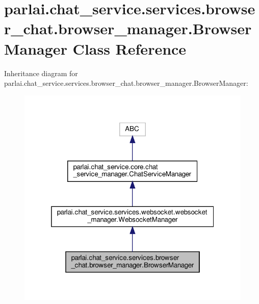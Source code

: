 \hypertarget{classparlai_1_1chat__service_1_1services_1_1browser__chat_1_1browser__manager_1_1BrowserManager}{}\section{parlai.\+chat\+\_\+service.\+services.\+browser\+\_\+chat.\+browser\+\_\+manager.\+Browser\+Manager Class Reference}
\label{classparlai_1_1chat__service_1_1services_1_1browser__chat_1_1browser__manager_1_1BrowserManager}


Inheritance diagram for parlai.\+chat\+\_\+service.\+services.\+browser\+\_\+chat.\+browser\+\_\+manager.\+Browser\+Manager\+:
\nopagebreak
\begin{figure}[H]
\begin{center}
\leavevmode
\includegraphics[width=319pt]{de/d9f/classparlai_1_1chat__service_1_1services_1_1browser__chat_1_1browser__manager_1_1BrowserManager__inherit__graph}
\end{center}
\end{figure}


